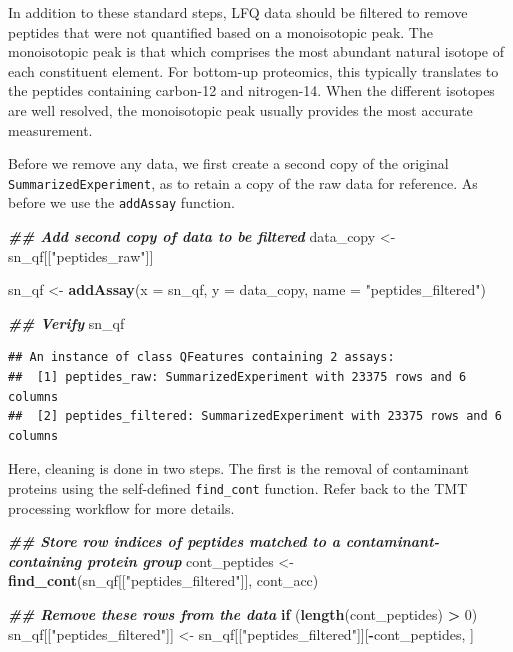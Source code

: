 \documentclass[9pt,a4paper,]{extarticle}
\newenvironment{Shaded}{\begin{snugshade}}{\end{snugshade}}
\newcommand{\AttributeTok}[1]{\textcolor[rgb]{0.13,0.29,0.53}{#1}}
\newcommand{\ControlFlowTok}[1]{\textcolor[rgb]{0.13,0.29,0.53}{\textbf{#1}}}
\newcommand{\DecValTok}[1]{\textcolor[rgb]{0.00,0.00,0.81}{#1}}
\newcommand{\DocumentationTok}[1]{\textcolor[rgb]{0.56,0.35,0.01}{\textbf{\textit{#1}}}}
\newcommand{\FunctionTok}[1]{\textcolor[rgb]{0.13,0.29,0.53}{\textbf{#1}}}
\newcommand{\NormalTok}[1]{#1}
\newcommand{\OtherTok}[1]{\textcolor[rgb]{0.56,0.35,0.01}{#1}}
\newcommand{\SpecialCharTok}[1]{\textcolor[rgb]{0.81,0.36,0.00}{\textbf{#1}}}
\newcommand{\StringTok}[1]{\textcolor[rgb]{0.31,0.60,0.02}{#1}}
\begin{document}
In addition to these standard steps, LFQ data should be filtered to remove
peptides that were not quantified based on a monoisotopic peak. The monoisotopic
peak is that which comprises the most abundant natural isotope of each
constituent element. For bottom-up proteomics, this typically translates to the
peptides containing carbon-12 and nitrogen-14. When the different isotopes are
well resolved, the monoisotopic peak usually provides the most accurate
measurement.

Before we remove any data, we first create a second copy of the original
\texttt{SummarizedExperiment}, as to retain a copy of the raw data for reference. As
before we use the \texttt{addAssay} function.

\begin{Shaded}
\begin{Highlighting}[]
\DocumentationTok{\#\# Add second copy of data to be filtered}
\NormalTok{data\_copy }\OtherTok{\textless{}{-}}\NormalTok{ sn\_qf[[}\StringTok{"peptides\_raw"}\NormalTok{]]}

\NormalTok{sn\_qf }\OtherTok{\textless{}{-}} \FunctionTok{addAssay}\NormalTok{(}\AttributeTok{x =}\NormalTok{ sn\_qf,}
                  \AttributeTok{y =}\NormalTok{ data\_copy, }
                  \AttributeTok{name =} \StringTok{"peptides\_filtered"}\NormalTok{)}

\DocumentationTok{\#\# Verify}
\NormalTok{sn\_qf}
\end{Highlighting}
\end{Shaded}

\begin{verbatim}
## An instance of class QFeatures containing 2 assays:
##  [1] peptides_raw: SummarizedExperiment with 23375 rows and 6 columns 
##  [2] peptides_filtered: SummarizedExperiment with 23375 rows and 6 columns
\end{verbatim}

Here, cleaning is done in two steps. The first is the removal of contaminant
proteins using the self-defined \texttt{find\_cont} function. Refer back to the TMT
processing workflow for more details.

\begin{Shaded}
\begin{Highlighting}[]
\DocumentationTok{\#\# Store row indices of peptides matched to a contaminant{-}containing protein group}
\NormalTok{cont\_peptides }\OtherTok{\textless{}{-}} \FunctionTok{find\_cont}\NormalTok{(sn\_qf[[}\StringTok{"peptides\_filtered"}\NormalTok{]], cont\_acc)}

\DocumentationTok{\#\# Remove these rows from the data}
\ControlFlowTok{if}\NormalTok{ (}\FunctionTok{length}\NormalTok{(cont\_peptides) }\SpecialCharTok{\textgreater{}} \DecValTok{0}\NormalTok{)}
\NormalTok{  sn\_qf[[}\StringTok{"peptides\_filtered"}\NormalTok{]] }\OtherTok{\textless{}{-}}\NormalTok{ sn\_qf[[}\StringTok{"peptides\_filtered"}\NormalTok{]][}\SpecialCharTok{{-}}\NormalTok{cont\_peptides, ]}
\end{Highlighting}
\end{Shaded}
\end{document}
